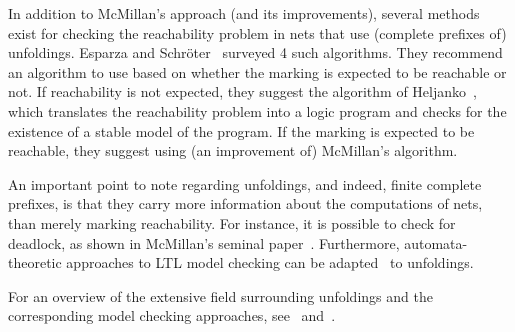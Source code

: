 In addition to McMillan's approach (and its improvements), several methods
exist for checking the reachability problem in nets that use (complete prefixes
of) unfoldings. Esparza and Schr\"{o}ter~\cite{Esparza2001} surveyed 4 such
algorithms. They recommend an algorithm to use based on whether the
marking is expected to be reachable or not. If reachability is not expected,
they suggest the algorithm of Heljanko~\cite{Heljanko1999a}, which translates
the reachability problem into a logic program and checks for the existence of a
stable model of the program. If the marking is expected to be reachable, they
suggest using (an improvement of) McMillan's algorithm.

An important point to note regarding unfoldings, and indeed, finite complete
prefixes, is that they carry more information about the computations of nets,
than merely marking reachability. For instance, it is possible to check for
deadlock, as shown in McMillan's seminal paper~\cite{McMillan1992}.
Furthermore, automata-theoretic approaches to LTL model checking can be
adapted~\cite{Heljanko2000, Wallner1998} to unfoldings.

For an overview of the extensive field surrounding unfoldings and the
corresponding model checking approaches, see~\cite{Esparza2008}
and~\cite{Esparza2010}.
